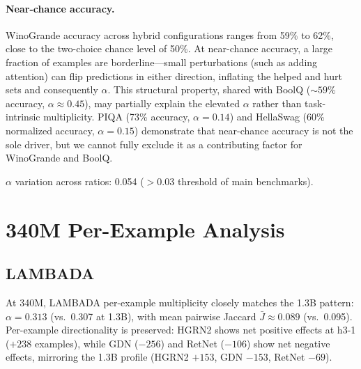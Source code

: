 \paragraph{Near-chance accuracy.} WinoGrande accuracy across hybrid configurations ranges from 59\% to 62\%, close to the two-choice chance level of 50\%. At near-chance accuracy, a large fraction of examples are borderline---small perturbations (such as adding attention) can flip predictions in either direction, inflating the helped and hurt sets and consequently $\alpha$. This structural property, shared with BoolQ (${\sim}59\%$ accuracy, $\alpha \approx 0.45$), may partially explain the elevated $\alpha$ rather than task-intrinsic multiplicity. PIQA (73\% accuracy, $\alpha = 0.14$) and HellaSwag (60\% normalized accuracy, $\alpha = 0.15$) demonstrate that near-chance accuracy is not the sole driver, but we cannot fully exclude it as a contributing factor for WinoGrande and BoolQ.

\begin{table}[ht]
\centering
\small
\caption{WinoGrande predictive multiplicity at 1.3B (h3-1).}
\label{tab:winogrande_multiplicity}
\par\vspace{1pt}
{\footnotesize $\alpha$ variation across ratios: 0.054 ($> 0.03$ threshold of main benchmarks).}
\end{table}

\section{340M Per-Example Analysis}\label{app:scale_per_example}

\subsection{LAMBADA}

At 340M, LAMBADA per-example multiplicity closely matches the 1.3B pattern: $\alpha = 0.313$ (vs.\ 0.307 at 1.3B), with mean pairwise Jaccard $\bar{J} \approx 0.089$ (vs.\ 0.095). Per-example directionality is preserved: HGRN2 shows net positive effects at h3-1 ($+238$ examples), while GDN ($-256$) and RetNet ($-106$) show net negative effects, mirroring the 1.3B profile (HGRN2 $+153$, GDN $-153$, RetNet $-69$).

